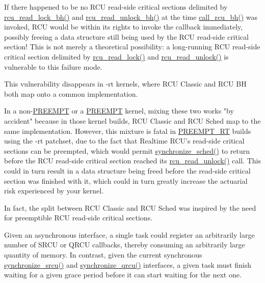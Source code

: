 
If there happened to be no RCU read-side critical
sections delimited by \url{rcu_read_lock_bh()} and
\url{rcu_read_unlock_bh()} at the time \url{call_rcu_bh()}
was invoked, RCU would be within its rights to invoke the callback
immediately, possibly freeing a data structure still being used by
the RCU read-side critical section!
This is not merely a theoretical possibility: a long-running RCU
read-side critical section delimited by \url{rcu_read_lock()}
and \url{rcu_read_unlock()} is vulnerable to this failure mode.

This vulnerability disappears in -rt kernels, where
RCU Classic and RCU BH both map onto a common implementation.


In a non-\url{PREEMPT} or a \url{PREEMPT} kernel, mixing these
two works "by accident" because in those kernel builds, RCU Classic and RCU
Sched map to the same implementation.
However, this mixture is fatal in \url{PREEMPT_RT} builds using the -rt
patchset, due to the fact that Realtime RCU's read-side critical
sections can be preempted, which would permit
\url{synchronize_sched()} to return before the
RCU read-side critical section reached its \url{rcu_read_unlock()}
call.
This could in turn result in a data structure being freed before the
read-side critical section was finished with it,
which could in turn greatly increase the actuarial risk experienced
by your kernel.

In fact, the split between RCU Classic and RCU Sched was inspired
by the need for preemptible RCU read-side critical sections.


Given an asynchronous interface, a single task
could register an arbitrarily large number of SRCU or QRCU callbacks,
thereby consuming an arbitrarily large quantity of memory.
In contrast, given the current synchronous
\url{synchronize_srcu()} and \url{synchronize_qrcu()}
interfaces, a given task must finish waiting for a given grace period
before it can start waiting for the next one.


